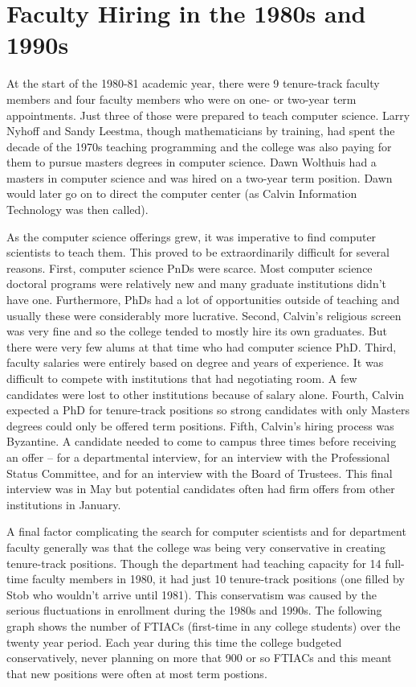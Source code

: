 \documentclass[
]{book}
\begin{document}
\hypertarget{faculty-hiring-in-the-1980s-and-1990s}{%
\section{Faculty Hiring in the 1980s and 1990s}\label{faculty-hiring-in-the-1980s-and-1990s}}

At the start of the 1980-81 academic year, there were 9 tenure-track faculty members and four faculty members who were on one- or two-year term appointments. Just three of those were prepared to teach computer science. Larry Nyhoff and Sandy Leestma, though mathematicians by training, had spent the decade of the 1970s teaching programming and the college was also paying for them to pursue masters degrees in computer science. Dawn Wolthuis had a masters in computer science and was hired on a two-year term position. Dawn would later go on to direct the computer center (as Calvin Information Technology was then called).

As the computer science offerings grew, it was imperative to find computer scientists to teach them. This proved to be extraordinarily difficult for several reasons. First, computer science PnDs were scarce. Most computer science doctoral programs were relatively new and many graduate institutions didn't have one. Furthermore, PhDs had a lot of opportunities outside of teaching and usually these were considerably more lucrative. Second, Calvin's religious screen was very fine and so the college tended to mostly hire its own graduates. But there were very few alums at that time who had computer science PhD. Third, faculty salaries were entirely based on degree and years of experience. It was difficult to compete with institutions that had negotiating room. A few candidates were lost to other institutions because of salary alone. Fourth, Calvin expected a PhD for tenure-track positions so strong candidates with only Masters degrees could only be offered term positions. Fifth, Calvin's hiring process was Byzantine. A candidate needed to come to campus three times before receiving an offer -- for a departmental interview, for an interview with the Professional Status Committee, and for an interview with the Board of Trustees. This final interview was in May but potential candidates often had firm offers from other institutions in January.

A final factor complicating the search for computer scientists and for department faculty generally was that the college was being very conservative in creating tenure-track positions. Though the department had teaching capacity for 14 full-time faculty members in 1980, it had just 10 tenure-track positions (one filled by Stob who wouldn't arrive until 1981). This conservatism was caused by the serious fluctuations in enrollment during the 1980s and 1990s. The following graph shows the number of FTIACs (first-time in any college students) over the twenty year period. Each year during this time the college budgeted conservatively, never planning on more that 900 or so FTIACs and this meant that new positions were often at most term postions.
\end{document}
